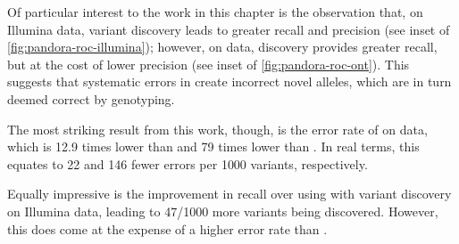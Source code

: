 Of particular interest to the work in this chapter is the observation that, on Illumina data, \denovo{} variant discovery leads to greater recall and precision (see inset of \autoref{fig:pandora-roc-illumina}); however, on \ont{} data, \denovo{} discovery provides greater recall, but at the cost of lower precision (see inset of \autoref{fig:pandora-roc-ont}). This suggests that systematic errors in \ont{} create incorrect novel alleles, which are in turn deemed correct by genotyping.

The most striking result from this work, though, is the error rate of \pandora{} on \ont{} data, which is 12.9 times lower than  and 79 times lower than . In real terms, this equates to 22 and 146 fewer errors per 1000 variants, respectively.

Equally impressive is the improvement in recall over  using \pandora{} with variant discovery on Illumina data, leading to 47/1000 more variants being discovered. However, this does come at the expense of a higher error rate than .

